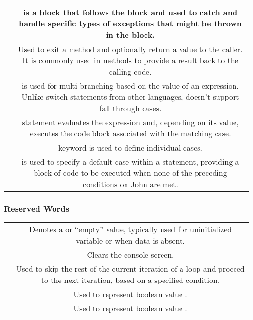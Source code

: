 \begin{center}
\begin{tabulary}{\linewidth}{|C|C|}
     &  is a block that follows the  block and used to catch and handle specific types of exceptions that might be thrown in the  block. \\
    \hline
     & Used to exit a method and optionally return a value to the caller. It is commonly used in methods to provide a result back to the calling code. \\
    \hline
    &  is used for multi-branching based on the value of an expression. Unlike switch statements from other languages,  doesn’t support fall through cases. \\
     &  statement evaluates the expression and, depending on its value, executes the code block associated with the matching case. \\
     &  keyword is used to define individual cases. \\
     &  is used to specify a default case within a  statement, providing a block of code to be executed when none of the preceding conditions on John are met. \\
    \hline
  \end{tabulary}
\end{center}

\subsubsection{Reserved Words}
\begin{center}
  \begin{tabulary}{\linewidth}{|C|C|}
    \hline
     &  \\
    \hline
    \hline
     & Denotes a  or ``empty'' value, typically used for uninitialized variable or when data is absent. \\
    \hline
     & Clears the console screen. \\
    \hline
     & Used to skip the rest of the current iteration of a loop and proceed to the next iteration, based on a specified condition. \\
    \hline
     & Used to represent boolean value . \\
    \hline
     & Used to represent boolean value .\\
    \hline
  \end{tabulary}
\end{center}
